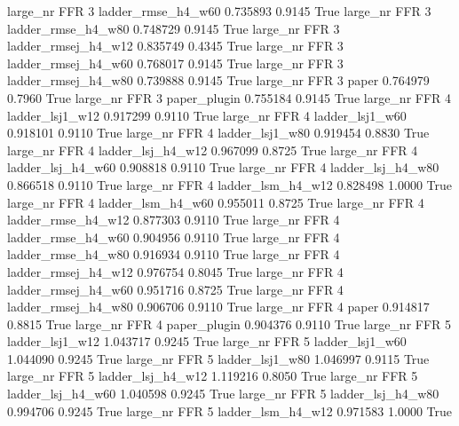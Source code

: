   large_nr      FFR                 3  ladder_rmse_h4_w60   0.735893      0.9145    True
  large_nr      FFR                 3  ladder_rmse_h4_w80   0.748729      0.9145    True
  large_nr      FFR                 3 ladder_rmsej_h4_w12   0.835749      0.4345    True
  large_nr      FFR                 3 ladder_rmsej_h4_w60   0.768017      0.9145    True
  large_nr      FFR                 3 ladder_rmsej_h4_w80   0.739888      0.9145    True
  large_nr      FFR                 3               paper   0.764979      0.7960    True
  large_nr      FFR                 3        paper_plugin   0.755184      0.9145    True
  large_nr      FFR                 4     ladder_lsj1_w12   0.917299      0.9110    True
  large_nr      FFR                 4     ladder_lsj1_w60   0.918101      0.9110    True
  large_nr      FFR                 4     ladder_lsj1_w80   0.919454      0.8830    True
  large_nr      FFR                 4   ladder_lsj_h4_w12   0.967099      0.8725    True
  large_nr      FFR                 4   ladder_lsj_h4_w60   0.908818      0.9110    True
  large_nr      FFR                 4   ladder_lsj_h4_w80   0.866518      0.9110    True
  large_nr      FFR                 4   ladder_lsm_h4_w12   0.828498      1.0000    True
  large_nr      FFR                 4   ladder_lsm_h4_w60   0.955011      0.8725    True
  large_nr      FFR                 4  ladder_rmse_h4_w12   0.877303      0.9110    True
  large_nr      FFR                 4  ladder_rmse_h4_w60   0.904956      0.9110    True
  large_nr      FFR                 4  ladder_rmse_h4_w80   0.916934      0.9110    True
  large_nr      FFR                 4 ladder_rmsej_h4_w12   0.976754      0.8045    True
  large_nr      FFR                 4 ladder_rmsej_h4_w60   0.951716      0.8725    True
  large_nr      FFR                 4 ladder_rmsej_h4_w80   0.906706      0.9110    True
  large_nr      FFR                 4               paper   0.914817      0.8815    True
  large_nr      FFR                 4        paper_plugin   0.904376      0.9110    True
  large_nr      FFR                 5     ladder_lsj1_w12   1.043717      0.9245    True
  large_nr      FFR                 5     ladder_lsj1_w60   1.044090      0.9245    True
  large_nr      FFR                 5     ladder_lsj1_w80   1.046997      0.9115    True
  large_nr      FFR                 5   ladder_lsj_h4_w12   1.119216      0.8050    True
  large_nr      FFR                 5   ladder_lsj_h4_w60   1.040598      0.9245    True
  large_nr      FFR                 5   ladder_lsj_h4_w80   0.994706      0.9245    True
  large_nr      FFR                 5   ladder_lsm_h4_w12   0.971583      1.0000    True
